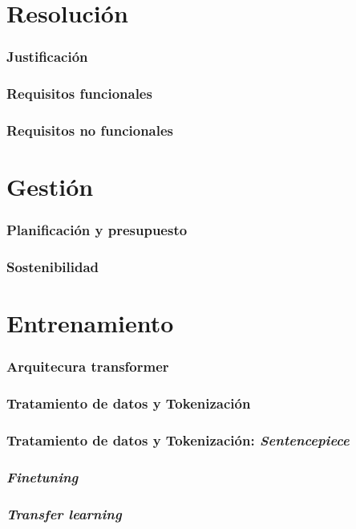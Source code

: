 \documentclass[aspectratio=169]{beamer}
\begin{document}
\section{Resolución}
\begin{frame}
    \frametitle{Justificación}
\end{frame}

\begin{frame}
\frametitle{Requisitos funcionales}
\end{frame}

\begin{frame}
\frametitle{Requisitos no funcionales}
\end{frame}








\section{Gestión}
\begin{frame}
    \frametitle{Planificación y presupuesto}
\end{frame}

\begin{frame}
    \frametitle{Sostenibilidad}
\end{frame}








\section{Entrenamiento}
\begin{frame}
    \frametitle{Arquitecura transformer}
\end{frame}

\begin{frame}
    \frametitle{Tratamiento de datos y Tokenización}
\end{frame}

\begin{frame}
    \frametitle{Tratamiento de datos y Tokenización: \textit{Sentencepiece}}
\end{frame}

\begin{frame}
    \frametitle{\textit{Finetuning}}
\end{frame}

\begin{frame}
    \frametitle{\textit{Transfer learning}}
\end{frame}
\end{document}
